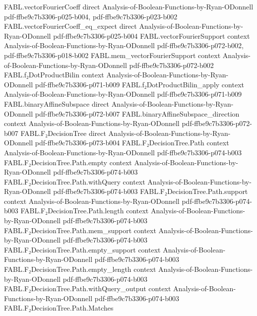 \begin{theorem}
\proofstep
  {FABL.vectorFourierCoeff}
  {direct}
  {Analysis-of-Boolean-Functions-by-Ryan-ODonnell}
  {pdf-ffbe9c7b3306-p025-b004,
    pdf-ffbe9c7b3306-p023-b002}
\proofstep
  {FABL.vectorFourierCoeff_eq_expect}
  {direct}
  {Analysis-of-Boolean-Functions-by-Ryan-ODonnell}
  {pdf-ffbe9c7b3306-p025-b004}
\proofstep
  {FABL.vectorFourierSupport}
  {context}
  {Analysis-of-Boolean-Functions-by-Ryan-ODonnell}
  {pdf-ffbe9c7b3306-p072-b002,
    pdf-ffbe9c7b3306-p018-b002}
\proofstep
  {FABL.mem_vectorFourierSupport}
  {context}
  {Analysis-of-Boolean-Functions-by-Ryan-ODonnell}
  {pdf-ffbe9c7b3306-p072-b002}
\proofstep
  {FABL.f₂DotProductBilin}
  {context}
  {Analysis-of-Boolean-Functions-by-Ryan-ODonnell}
  {pdf-ffbe9c7b3306-p071-b009}
\proofstep
  {FABL.f₂DotProductBilin_apply}
  {context}
  {Analysis-of-Boolean-Functions-by-Ryan-ODonnell}
  {pdf-ffbe9c7b3306-p071-b009}
\proofstep
  {FABL.binaryAffineSubspace}
  {direct}
  {Analysis-of-Boolean-Functions-by-Ryan-ODonnell}
  {pdf-ffbe9c7b3306-p072-b007}
\proofstep
  {FABL.binaryAffineSubspace_direction}
  {context}
  {Analysis-of-Boolean-Functions-by-Ryan-ODonnell}
  {pdf-ffbe9c7b3306-p072-b007}
\proofstep
  {FABL.F₂DecisionTree}
  {direct}
  {Analysis-of-Boolean-Functions-by-Ryan-ODonnell}
  {pdf-ffbe9c7b3306-p073-b004}
\proofstep
  {FABL.F₂DecisionTree.Path}
  {context}
  {Analysis-of-Boolean-Functions-by-Ryan-ODonnell}
  {pdf-ffbe9c7b3306-p074-b003}
\proofstep
  {FABL.F₂DecisionTree.Path.empty}
  {context}
  {Analysis-of-Boolean-Functions-by-Ryan-ODonnell}
  {pdf-ffbe9c7b3306-p074-b003}
\proofstep
  {FABL.F₂DecisionTree.Path.withQuery}
  {context}
  {Analysis-of-Boolean-Functions-by-Ryan-ODonnell}
  {pdf-ffbe9c7b3306-p074-b003}
\proofstep
  {FABL.F₂DecisionTree.Path.support}
  {context}
  {Analysis-of-Boolean-Functions-by-Ryan-ODonnell}
  {pdf-ffbe9c7b3306-p074-b003}
\proofstep
  {FABL.F₂DecisionTree.Path.length}
  {context}
  {Analysis-of-Boolean-Functions-by-Ryan-ODonnell}
  {pdf-ffbe9c7b3306-p074-b003}
\proofstep
  {FABL.F₂DecisionTree.Path.mem_support}
  {context}
  {Analysis-of-Boolean-Functions-by-Ryan-ODonnell}
  {pdf-ffbe9c7b3306-p074-b003}
\proofstep
  {FABL.F₂DecisionTree.Path.empty_support}
  {context}
  {Analysis-of-Boolean-Functions-by-Ryan-ODonnell}
  {pdf-ffbe9c7b3306-p074-b003}
\proofstep
  {FABL.F₂DecisionTree.Path.empty_length}
  {context}
  {Analysis-of-Boolean-Functions-by-Ryan-ODonnell}
  {pdf-ffbe9c7b3306-p074-b003}
\proofstep
  {FABL.F₂DecisionTree.Path.withQuery_output}
  {context}
  {Analysis-of-Boolean-Functions-by-Ryan-ODonnell}
  {pdf-ffbe9c7b3306-p074-b003}
\proofstep
  {FABL.F₂DecisionTree.Path.Matches}

\end{theorem}

